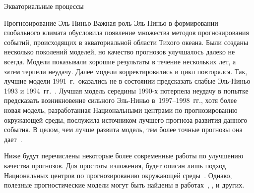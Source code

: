 \begin{chapter}{Экваториальные процессы}
\begin{section}{Прогнозирование Эль-Ниньо}
%
Важная роль Эль-Ниньо в формировании глобального климата обусловила появление
множества методов прогнозирования событий, происходящих в экваториальной 
области Тихого океана. Были созданы несколько поколений моделей, но качество
прогнозов улучшалось далеко не всегда. Модели показывали хорошие результаты
в течение нескольких лет, а затем терпели неудачу. Далее модели 
корректировались и цикл повторялся. Так, лучшие модели 1991~г.\ оказались
не в состоянии предсказать слабые Эль-Ниньо 1993 и 1994~гг.~\cite{Ji:1996}. 
Лучшая модель середины 1990-х потерпела
неудачу в попытке предсказать возникновение сильного Эль-Ниньо 
в~1997--1998~гг., хотя более новая модель, разработанная Национальными 
центрами по прогнозированию окружающей среды, послужила источником лучшего
прогноза развития данного события. В целом, чем лучше развита модель,
тем более точные прогнозы она дает~\cite{Kerr:1998}.
%

Ниже будут перечислены некоторые более современные работы по улучшению 
качества прогнозов. Для простоты изложения, будет описан лишь подход
Национальных центров по прогнозированию окружающей среды~\cite{Ji:1998}. 
Однако, полезные прогностические модели
могут быть найдены в работах~\cite{Chen:1995}, \cite{Latif:1993}, 
\cite{Barnett:1993} и других.
%


\end{section}
\end{chapter}
